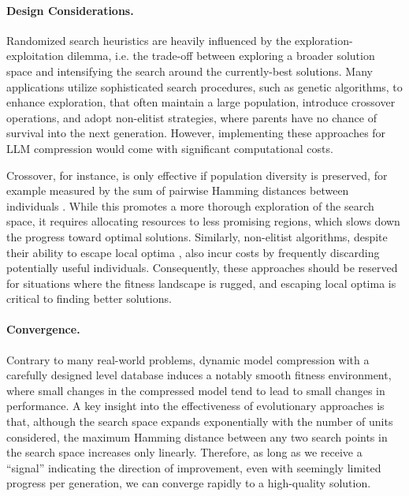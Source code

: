 \documentclass{article}
\theoremstyle{plain}
\theoremstyle{definition}
\theoremstyle{remark}
\begin{document}
\paragraph{Design Considerations.} 
Randomized search heuristics are heavily influenced by the exploration-exploitation dilemma, i.e. the trade-off between exploring a broader solution space and intensifying the search around the currently-best solutions. Many applications utilize sophisticated search procedures, such as genetic algorithms, to enhance exploration, that often maintain a large population, introduce crossover operations, and adopt non-elitist strategies, where parents have no chance of survival into the next generation. However, implementing these approaches for LLM compression would come with significant computational costs.

Crossover, for instance, is only effective if population diversity is preserved, for example measured by the sum of pairwise Hamming distances between individuals \citep{jansen_crossover_algorithmica, lengler_crossover_gecco24}. While this promotes a more thorough exploration of the search space, it requires allocating resources to less promising regions, which slows down the progress toward optimal solutions. Similarly, non-elitist algorithms, despite their ability to escape local optima \citep{lehre_escaping_optima, polynomialSlowdown1+lambda, exponentialSlowdown1+lambda}, also incur costs by frequently discarding potentially useful individuals. Consequently, these approaches should be reserved for situations where the fitness landscape is  rugged, and escaping local optima is critical to finding better solutions.

\paragraph{Convergence.} Contrary to many real-world problems, dynamic model compression with a carefully designed level database induces a notably smooth fitness environment, where small changes in the compressed model tend to lead to small changes in performance. A key insight into the effectiveness of evolutionary approaches is that, although the search space expands exponentially with the number of units considered, the maximum Hamming distance between any two search points in the search space increases only linearly. Therefore, as long as we receive a ``signal'' indicating the direction of improvement, even with seemingly limited progress per generation, we can converge rapidly to a high-quality solution.
\end{document}
